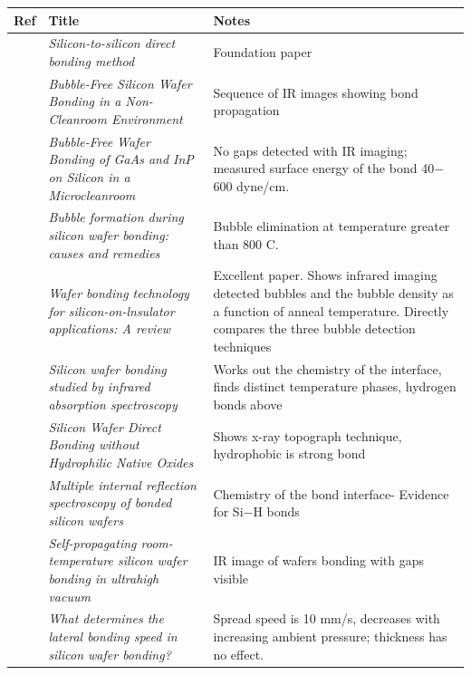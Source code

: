 \documentclass[osajnl,preprint,showpacs,superscriptaddress,12pt]{revtex4-1} %
\begin{document}
\begin{spacing}{1.0} 
\begin{center}
\begin{longtable}{ |c | p{8cm} | p{8cm} |}
    \hline
    Ref & Title & Notes \\ 
        \hline
	\cite{1986JAP....60.2987S} &  \emph{Silicon-to-silicon direct bonding method} &  Foundation paper  \\
         \hline
     \cite{1988JaJAP..27L2364S} &  \emph{Bubble-Free Silicon Wafer Bonding in a Non-Cleanroom Environment} &  Sequence of IR images showing bond propagation  \\
         \hline
     \cite{1989JaJAP..28L2141L} &  \emph{Bubble-Free Wafer Bonding of GaAs and InP on Silicon in a Microcleanroom} &  No gaps detected with IR imaging; measured surface energy of the bond 40$-$600 dyne/cm.  \\
         \hline
     \cite{Mitani1990} &  \emph{Bubble formation during silicon wafer bonding: causes and remedies} &  Bubble elimination at temperature greater than 800 C. \\
         \hline
	\cite{1992JEMat..21..669M} &  \emph{Wafer bonding technology for silicon-on-lnsulator applications: A review} &  Excellent paper.  Shows infrared imaging detected bubbles and the bubble density as a function of anneal temperature.  Directly compares the three bubble detection techniques\\
         \hline
     \cite{feijoo1994} &  \emph{Silicon wafer bonding studied by infrared absorption spectroscopy} &  Works out the chemistry of the interface, finds distinct temperature phases, hydrogen bonds above   \\          
         \hline
     \cite{1994JaJAP..33....6H} &  \emph{Silicon Wafer Direct Bonding without Hydrophilic Native Oxides} &  Shows x-ray topograph technique, hydrophobic is strong bond\\
              \hline         
     \cite{1995ApPhA..61..101R} &  \emph{Multiple internal reflection spectroscopy of bonded silicon wafers} &  Chemistry of the bond interface- Evidence for Si$-$H bonds\\
              \hline
     \cite{1995ApPhL..67.3614G} &  \emph{Self-propagating room-temperature silicon wafer bonding in ultrahigh vacuum} &  IR image of wafers bonding with gaps visible  \\
              \hline     
     \cite{1995ApPhL..67..863G} &  \emph{What determines the lateral bonding speed in silicon wafer bonding?} &  Spread speed is 10 mm/s, decreases with increasing ambient pressure; thickness has no effect.  \\

\end{longtable}
\end{center}
\end{spacing}
\end{document}
